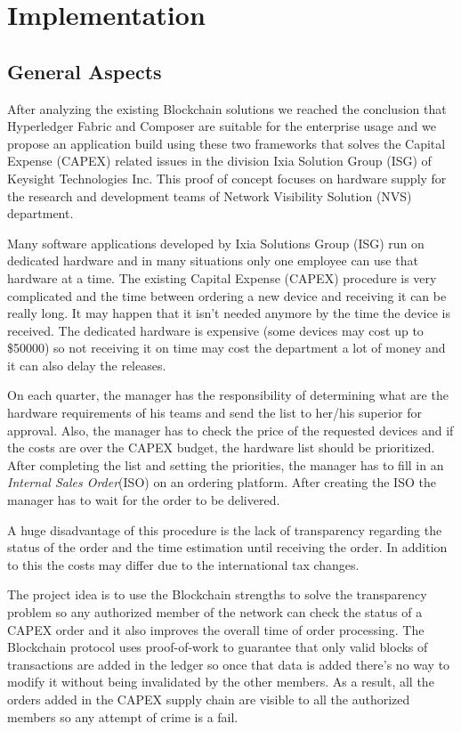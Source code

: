 \chapter{Implementation}
\label{chapter:chapter3}

\section{General Aspects}
\label{sec:chapter3-section1}
After analyzing the existing Blockchain solutions we reached the conclusion that Hyperledger Fabric and Composer are suitable for the enterprise usage and we propose an application build using these two frameworks that solves the Capital Expense (CAPEX) related issues in the division Ixia Solution Group (ISG) of Keysight Technologies Inc. This proof of concept focuses on hardware supply for the research and development teams of Network Visibility Solution (NVS) department.

Many software applications developed by Ixia Solutions Group (ISG) run on dedicated hardware and in many situations only one employee can use that hardware at a time.
The existing Capital Expense (CAPEX) procedure is very complicated and the time between ordering a new device and receiving it can be really long. It may happen that it isn't needed anymore by the time the device is received. The dedicated hardware is expensive (some devices may cost up to \$50000) so not receiving it on time may cost the department a lot of money and it can also delay the releases.

On each quarter, the manager has the responsibility of determining what are the hardware requirements of his teams and send the list to her/his superior for approval.
Also, the manager has to check the price of the requested devices and if the costs are over the CAPEX budget, the hardware list should be prioritized. 
After completing the list and setting the priorities, the manager has to fill in an \emph{Internal Sales Order}(ISO) on an ordering platform. After creating the ISO the manager has to wait for the order to be delivered.

A huge disadvantage of this procedure is the lack of transparency regarding the status of the order and the time estimation until receiving the order.
In addition to this the costs may differ due to the international tax changes. 

The project idea is to use the Blockchain strengths to solve the transparency problem so any authorized member of  the network can check the status of a CAPEX order and it also improves the overall time of order processing.
The Blockchain protocol uses proof-of-work to guarantee that only valid blocks of transactions are added in the ledger so once that data is added there's no way to modify it without being invalidated by the other members.
As a result, all the orders added in the CAPEX supply chain are visible to all the authorized members so any attempt of crime is a fail.


